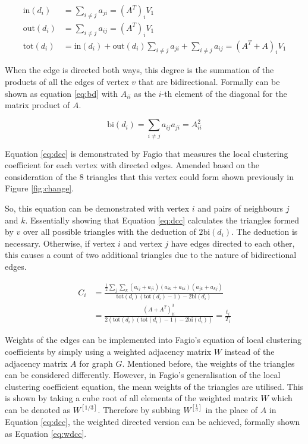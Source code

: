 \begin{align} \label{eq:idod}
\text{in}(d_i) &= \sum_{i\neq j}a_{ji} = (A^T)_i V_1 \\
\text{out}(d_i) &= \sum_{i\neq j}a_{ij} = (A^T)_i V_1 \nonumber \\
\text{tot}(d_i) &= \text{in}(d_i) + \text{out}(d_i) \sum_{i\neq j}a_{ji} + \sum_{i\neq j}a_{ij} = (A^T + A)_i V_1 \nonumber
\end{align}

When the edge is directed both ways, this degree is the summation of the products of all the edges of vertex $v$ that are bidirectional. Formally can be shown as equation \ref{eq:bd} with $A_{ii}$ as the $i$-th element of the diagonal for the matrix product of $A$.

\begin{equation} \label{eq:bd}
\text{bi}(d_i) = \sum_{i\neq j}a_{ij}a_{ji} = A_{ii}^2 
\end{equation}
 
Equation \ref{eq:dcc} is demonstrated by Fagio \cite{Fagiolo_2007} that measures the local clustering coefficient for each vertex with directed edges. Amended based on the consideration of the 8 triangles that this vertex could form shown previously in Figure \ref{fig:change}. 

So, this equation can be demonstrated with vertex $i$ and pairs of neighbours $j$ and $k$. Essentially showing that Equation \ref{eq:dcc} calculates the triangles formed by $v$ over all possible triangles with the deduction of $2\text{bi}(d_i)$. The deduction is necessary. Otherwise, if vertex $i$ and vertex $j$ have edges directed to each other, this causes a count of two additional triangles due to the nature of bidirectional edges.

\begin{align} \label{eq:dcc}
C_i &= \frac{\frac{1}{2}\sum_j \sum_k (a_{ij} + a_{ji})(a_{ik} + a_{ki})(a_{jk} + a_{kj})}{\text{tot}(d_i)(\text{tot}(d_i) - 1) - 2\text{bi}(d_i)} \\
&= \frac{(A + A^T)^3_{ii}}{2(\text{tot}(d_i)(\text{tot}(d_i) - 1) - 2\text{bi}(d_i))} = \frac{t_i}{T_i} \nonumber
\end{align}

Weights of the edges can be implemented into Fagio's equation of local clustering coefficients by simply using a weighted adjacency matrix $W$ instead of the adjacency matrix $A$ for graph $G$. Mentioned before, the weights of the triangles can be considered differently. However, in Fagio's generalisation of the local clustering coefficient equation, the mean weights of the triangles are utilised. This is shown by taking a cube root of all elements of the weighted matrix $W$ which can be denoted as $W^{[1/3]}$. Therefore by subbing $W^{[\frac{1}{3}]}$ in the place of $A$ in Equation \ref{eq:dcc}, the weighted directed version can be achieved, formally shown as Equation \ref{eq:wdcc}.

